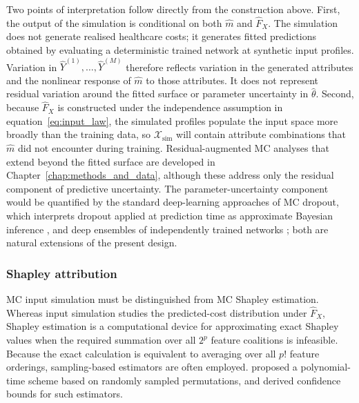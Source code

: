 \noindent
Two points of interpretation follow directly from the construction above.
First, the output of the simulation is conditional on both \(\widehat{m}\) and
\(\widehat{F}_{X}\). The simulation does not generate realised healthcare costs;
it generates fitted predictions obtained by evaluating a deterministic trained
network at synthetic input profiles. Variation in
\(\widehat{Y}^{(1)}, \ldots, \widehat{Y}^{(M)}\) therefore reflects variation
in the generated attributes and the nonlinear response of \(\widehat{m}\) to
those attributes. It does not represent residual variation around the fitted
surface or parameter uncertainty in \(\widehat{\theta}\). Second, because
\(\widehat{F}_{X}\) is constructed under the independence assumption in
equation~\eqref{eq:input_law}, the simulated profiles populate the input space
more broadly than the training data, so \(\mathcal{X}_{\mathrm{sim}}\) will
contain attribute combinations that \(\widehat{m}\) did not encounter during
training. Residual-augmented MC analyses that extend beyond the
fitted surface are developed in Chapter~\ref{chap:methods_and_data},
although these address only the residual component of predictive
uncertainty. The parameter-uncertainty component would be quantified by
the standard deep-learning approaches of MC dropout, which
interprets dropout applied at prediction time as approximate Bayesian
inference \citep{gal2016dropout}, and deep ensembles of independently
trained networks \citep{lakshminarayanan2017simple}; both are natural
extensions of the present design.


\subsubsection{Shapley attribution}
\label{shapley_attribution}
MC input simulation must be distinguished from MC
Shapley estimation. Whereas input simulation studies the predicted-cost
distribution under \(\widehat{F}_{X}\), Shapley estimation is a computational
device for approximating exact Shapley values when the required summation over
all \(2^p\) feature coalitions is infeasible. Because the exact calculation is
equivalent to averaging over all \(p!\) feature orderings, sampling-based
estimators are often employed. \citet{castro2009polynomial} proposed a
polynomial-time scheme based on randomly sampled permutations, and
\citet{maleki2013bounding} derived confidence bounds for such estimators.

